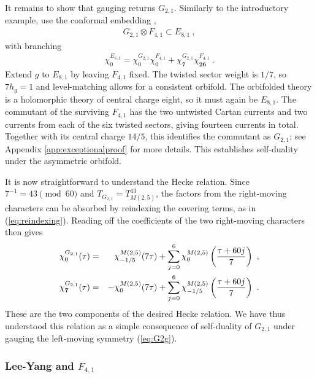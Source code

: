 \documentclass[12pt]{article}
\numberwithin{equation}{section}
\newcommand{\bea}{\begin{eqnarray}}
\newcommand{\eea}{\end{eqnarray}}
\def\no{\nonumber}
\theoremstyle{remark}
\begin{document}
It remains to show that gauging returns $G_{2,1}$. Similarly to the introductory example, use the conformal embedding \cite{Schellekens:1986mb},
\bea \label{eq:exceptionalembedding}
G_{2,1}\otimes F_{4,1}\subset E_{8,1}~,
\eea
with branching
\bea
\chi^{E_{8,1}}_0=\chi^{G_{2,1}}_0\chi^{F_{4,1}}_0+\chi^{G_{2,1}}_{\mathbf7}\chi^{F_{4,1}}_{\mathbf{26}}~.
\eea
Extend $g$ to $E_{8,1}$ by leaving $F_{4,1}$ fixed. The twisted sector weight is $1/7$, so $7h_g=1$ and level-matching allows for a consistent orbifold. The orbifolded theory is a holomorphic theory of central charge eight, so it must again be $E_{8,1}$. The commutant of the surviving $F_{4,1}$ has the two untwisted Cartan currents and two currents from each of the six twisted sectors, giving fourteen currents in total. Together with its central charge $14/5$, this identifies the commutant as $G_{2,1}$; see Appendix \ref{app:exceptionalproof} for more details.
This establishes self-duality under the asymmetric orbifold.

It is now straightforward to understand the Hecke relation. Since $7^{-1}=43\pmod{60}$ and $T_{G_{2,1}}=T_{M(2,5)}^{43}$, the factors from the right-moving characters can be absorbed by reindexing the covering terms, as in (\ref{eq:reindexing}). Reading off the coefficients of the two right-moving characters then gives
\bea
\chi^{G_{2,1}}_0(\tau)&=&\chi^{M(2,5)}_{-1/5}(7\tau)+\sum_{j=0}^6\chi^{M(2,5)}_0\left({\tau+60j\over 7}\right)~,\no\\
\chi^{G_{2,1}}_{\mathbf7}(\tau)&=&-\chi^{M(2,5)}_0(7\tau)+\sum_{j=0}^6\chi^{M(2,5)}_{-1/5}\left({\tau+60j\over 7}\right)~.
\eea
These are the two components of the desired Hecke relation. We have thus understood this relation as a simple consequence of self-duality of $G_{2,1}$ under gauging the left-moving symmetry (\ref{eq:G2g}). 

\subsubsection{Lee-Yang and $F_{4,1}$}
\label{sec:LeeYangF4}
\end{document}
